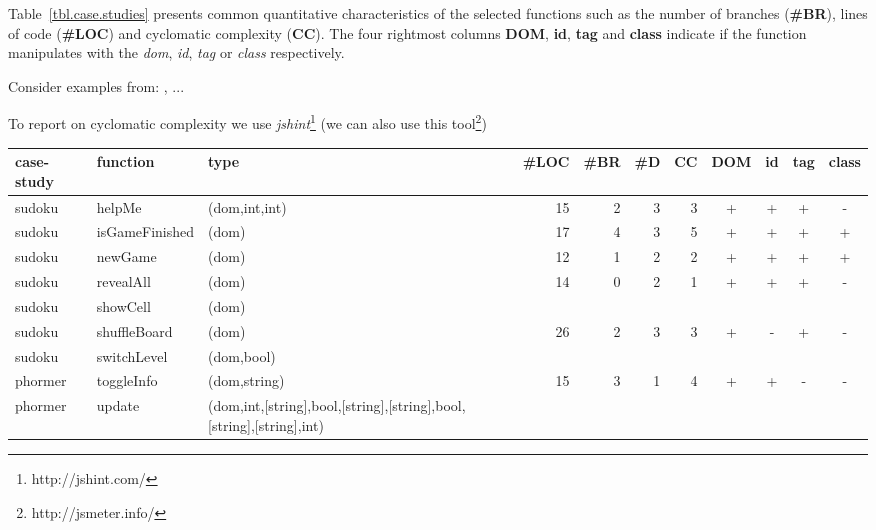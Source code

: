 \documentclass[sigconf]{acmart}
\begin{document}
Table~\ref{tbl.case.studies} presents common quantitative characteristics of the selected functions such as the number of branches (\textbf{\#BR}), lines of code (\textbf{\#LOC}) and cyclomatic complexity (\textbf{CC}). The four rightmost columns \textbf{DOM}, \textbf{id}, \textbf{tag} and \textbf{class} indicate if the function manipulates with the \emph{dom}, \emph{id}, \emph{tag} or \emph{class} respectively.       


Consider examples from: \cite{artemis2011}, \cite{dom2011}...

To report on cyclomatic complexity we use \emph{jshint}\footnote{http://jshint.com/} (we can also use this tool\footnote{http://jsmeter.info/})

\begin{table*}
  \caption{Summary of the case studies}
  \label{tbl.case.studies}
    \footnotesize
  \begin{tabular}{l|l|l|r|r|r|r|c|c|c|c}
    \toprule
    \textbf{case-study} & \textbf{function} & \textbf{type} & \textbf{\#LOC} & \textbf{\#BR} & \textbf{\#D} & \textbf{CC} & \textbf{DOM} & \textbf{id} & \textbf{tag} & \textbf{class} \\
    \midrule
    sudoku     & helpMe & (dom,int,int)                                   & 15 & 2  & 3 & 3  & + & + & + & - \\
    sudoku     & isGameFinished & (dom)                                   & 17 & 4  & 3 & 5  & + & + & + & + \\
    sudoku     & newGame & (dom)                                          & 12 & 1  & 2 & 2  & + & + & + & + \\
    sudoku     & revealAll & (dom)                                        & 14 & 0  & 2 & 1  & + & + & + & - \\
    sudoku     & showCell & (dom)                                         &    &    &   &    &   &   &   & \\
    sudoku     & shuffleBoard & (dom)                                     & 26 & 2  & 3 & 3  & + & - & + & - \\
    sudoku     & switchLevel & (dom,bool)                                 &    &    &   &    &   &   &   & \\
    \midrule
    phormer    & toggleInfo & (dom,string)                                & 15 & 3  & 1 & 4  & + & + & - & - \\
    phormer    & update & (dom,int,[string],bool,[string],[string],bool,[string],[string],int) &    &    &   &    &   &   &   & \\

\end{tabular}
\end{table*}
\end{document}
